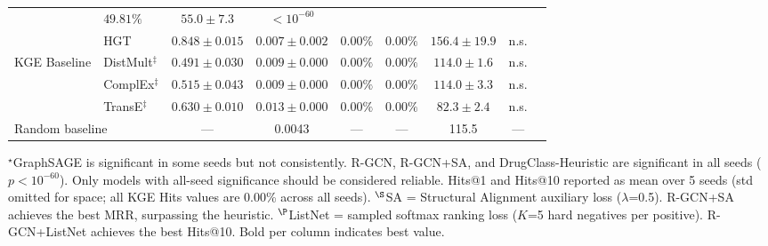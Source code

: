 \begin{table}[t]
\begin{tabular}{llccccccc}
    & $\mathbf{49.81\%}$
    & $55.0 \pm 7.3$
    & $< 10^{-60}$ \\
  & HGT
    & $0.848 \pm 0.015$
    & $0.007 \pm 0.002$
    & $0.00\%$
    & $0.00\%$
    & $156.4 \pm 19.9$
    & n.s. \\
\midrule
\multirow{3}{*}{KGE Baseline}
  & DistMult$^\ddagger$
    & $0.491 \pm 0.030$
    & $0.009 \pm 0.000$
    & $0.00\%$
    & $0.00\%$
    & $114.0 \pm 1.6$
    & n.s. \\
  & ComplEx$^\ddagger$
    & $0.515 \pm 0.043$
    & $0.009 \pm 0.000$
    & $0.00\%$
    & $0.00\%$
    & $114.0 \pm 3.3$
    & n.s. \\
  & TransE$^\ddagger$
    & $0.630 \pm 0.010$
    & $0.013 \pm 0.000$
    & $0.00\%$
    & $0.00\%$
    & $82.3 \pm 2.4$
    & n.s. \\
\midrule
\multicolumn{2}{l}{Random baseline} & --- & 0.0043 & --- & --- & 115.5 & --- \\
\bottomrule
\end{tabular}
\vspace{1mm}
\footnotesize{$^\star$GraphSAGE is significant in some seeds but not consistently. R-GCN, R-GCN+SA, and DrugClass-Heuristic are significant in all seeds ($p < 10^{-60}$). Only models with all-seed significance should be considered reliable. Hits@1 and Hits@10 reported as mean over 5 seeds (std omitted for space; all KGE Hits values are 0.00\% across all seeds). $^\S$SA = Structural Alignment auxiliary loss ($\lambda$=0.5). R-GCN+SA achieves the best MRR, surpassing the heuristic. $^\P$ListNet = sampled softmax ranking loss ($K$=5 hard negatives per positive). R-GCN+ListNet achieves the best Hits@10. Bold per column indicates best value.}
\end{table}
